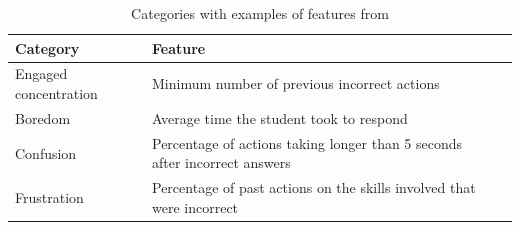\documentclass[11pt, oneside]{article}   	%
\begin{document}
\begin{table}[h!]
	\begin{tabularx}{\linewidth}{|X|X|X|}
		\hline
		 \textbf{Category} & \textbf{Feature} \\ \hline
		 Engaged concentration & Minimum number of previous incorrect actions \\ \hline
		 Boredom & Average time the student took to respond \\ \hline
		 Confusion & Percentage of actions taking longer than 5 seconds after incorrect answers \\ \hline
		 Frustration & Percentage of past actions on the skills involved that were incorrect \\ \hline

	\end{tabularx}
		 	\caption{Categories with examples of features from \cite{Baker2012}}
	\label{table:BakerTable}
\end{table}
\end{document}

